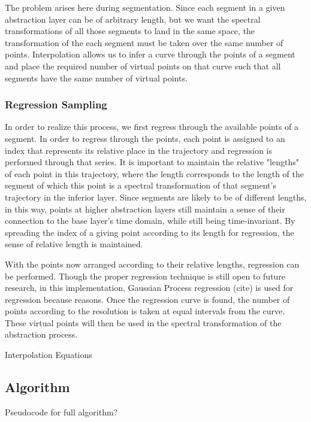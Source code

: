 \documentclass[runningheads]{llncs}
\begin{document}
The problem arises here during segmentation.  Since each segment in a given abstraction layer can be of arbitrary length, but we want the spectral transformations of all those segments to land in the same space, the transformation of the each segment must be taken over the same number of points.  Interpolation allows us to infer a curve through the points of a segment and place the required number of virtual points on that curve such that all segments have the same number of virtual points.

\subsubsection{Regression Sampling}

In order to realize this process, we first regress through the available points of a segment.  In order to regress through the points, each point is assigned to an index that represents its relative place in the trajectory and regression is performed through that series.  It is important to maintain the relative "lengths" of each point in this trajectory, where the length corresponds to the length of the segment of which this point is a spectral transformation of that segment's trajectory in the inferior layer.  Since segments are likely to be of different lengths, in this way, points at higher abstraction layers still maintain a sense of their connection to the base layer's time domain, while still being time-invariant.  By spreading the index of a giving point according to its length for regression, the sense of relative length is maintained.

With the points now arranged according to their relative lengths, regression can be performed. Though the proper regression technique is still open to future research, in this implementation, Gaussian Process regression (cite) is used for regression because reasons.  Once the regression curve is found, the number of points according to the resolution is taken at equal intervals from the curve.  These virtual points will then be used in the spectral transformation of the abstraction process.

Interpolation Equations


\subsection{Algorithm}
Pseudocode for full algorithm?
\end{document}
